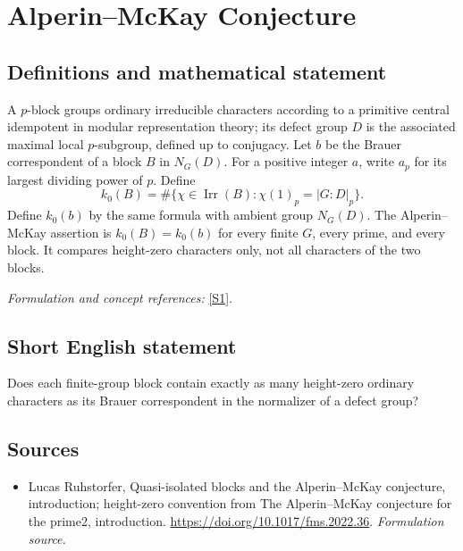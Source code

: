 \documentclass[11pt]{article}
\begin{document}
\section*{\texorpdfstring{Alperin–McKay Conjecture}{Alperin–McKay Conjecture}}\label{statement}
\subsection{Definitions and mathematical statement}
A $p$-block groups ordinary irreducible characters according to a primitive central idempotent in modular representation theory; its defect group $D$ is the associated maximal local $p$-subgroup, defined up to conjugacy. Let $b$ be the Brauer correspondent of a block $B$ in $N_G(D)$. For a positive integer $a$, write $a_p$ for its largest dividing power of $p$. Define
\[
 k_0(B)=\#\{\chi\in\operatorname{Irr}(B):\chi(1)_p=|G:D|_p\}.
\]
Define $k_0(b)$ by the same formula with ambient group $N_G(D)$. The Alperin--McKay assertion is $k_0(B)=k_0(b)$ for every finite $G$, every prime, and every block. It compares height-zero characters only, not all characters of the two blocks.
\par\smallskip\textit{Formulation and concept references:} \href{https://doi.org/10.1017/fms.2022.36}{[S1]}.

\subsection{Short English statement}
Does each finite-group block contain exactly as many height-zero ordinary characters as its Brauer correspondent in the normalizer of a defect group?
\subsection{Sources}
\begin{itemize}
\item[S1]Lucas Ruhstorfer, Quasi-isolated blocks and the Alperin–McKay conjecture, introduction; height-zero convention from The Alperin–McKay conjecture for the prime2, introduction.
\url{https://doi.org/10.1017/fms.2022.36}.
\textit{Formulation source.}
\end{itemize}
\end{document}
